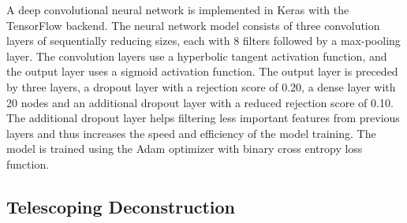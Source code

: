 \documentclass[notoc,preprintnumbers]{JHEP3}
\begin{document}
A deep convolutional neural network is implemented in Keras with the TensorFlow \cite{DBLP:journals/corr/AbadiBCCDDDGIIK16} backend. The neural network model consists of three convolution layers of sequentially reducing sizes, each with 8 filters followed by a max-pooling layer. The convolution layers use a hyperbolic tangent activation function, and the output layer uses a sigmoid activation function. The output layer is preceded by three layers, a dropout layer with a rejection score of 0.20, a dense layer with 20 nodes and an additional dropout layer with a reduced rejection score of 0.10. The additional dropout layer helps filtering less important features from previous layers and thus increases the speed and efficiency of the model training. The model is trained using the Adam optimizer with binary cross entropy loss function.

\subsection{Telescoping Deconstruction}
\label{sec:tjet}
\end{document}
